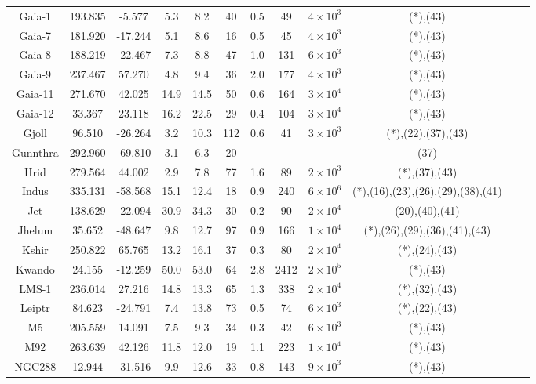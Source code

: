 \begin{table}
\begin{tabular}{cSSSScSccccc}
Gaia-1 & 193.835 & -5.577 & 5.3 & 8.2 & 40 & 0.5 & 49 & $4 \times 10^{3}$ & (*),(43) \\
Gaia-7 & 181.920 & -17.244 & 5.1 & 8.6 & 16 & 0.5 & 45 & $4 \times 10^{3}$ & (*),(43) \\
Gaia-8 & 188.219 & -22.467 & 7.3 & 8.8 & 47 & 1.0 & 131 & $6 \times 10^{3}$ & (*),(43) \\
Gaia-9 & 237.467 & 57.270 & 4.8 & 9.4 & 36 & 2.0 & 177 & $4 \times 10^{3}$ & (*),(43) \\
Gaia-11 & 271.670 & 42.025 & 14.9 & 14.5 & 50 & 0.6 & 164 & $3 \times 10^{4}$ & (*),(43) \\
Gaia-12 & 33.367 & 23.118 & 16.2 & 22.5 & 29 & 0.4 & 104 & $3 \times 10^{4}$ & (*),(43) \\
Gjoll & 96.510 & -26.264 & 3.2 & 10.3 & 112 & 0.6 & 41 & $3 \times 10^{3}$ & (*),(22),(37),(43) \\
Gunnthra & 292.960 & -69.810 & 3.1 & 6.3 & 20 & & & & (37) \\
Hrid & 279.564 & 44.002 & 2.9 & 7.8 & 77 & 1.6 & 89 & $2 \times 10^{3}$ & (*),(37),(43) \\
Indus & 335.131 & -58.568 & 15.1 & 12.4 & 18 & 0.9 & 240 & $6 \times 10^{6}$ & (*),(16),(23),(26),(29),(38),(41) \\
Jet & 138.629 & -22.094 & 30.9 & 34.3 & 30 & 0.2 & 90 & $2 \times 10^{4}$ & (20),(40),(41) \\
Jhelum & 35.652 & -48.647 & 9.8 & 12.7 & 97 & 0.9 & 166 & $1 \times 10^{4}$ & (*),(26),(29),(36),(41),(43) \\
Kshir & 250.822 & 65.765 & 13.2 & 16.1 & 37 & 0.3 & 80 & $2 \times 10^{4}$ & (*),(24),(43) \\
Kwando & 24.155 & -12.259 & 50.0 & 53.0 & 64 & 2.8 & 2412 & $2 \times 10^{5}$ & (*),(43) \\
LMS-1 & 236.014 & 27.216 & 14.8 & 13.3 & 65 & 1.3 & 338 & $2 \times 10^{4}$ & (*),(32),(43) \\
Leiptr & 84.623 & -24.791 & 7.4 & 13.8 & 73 & 0.5 & 74 & $6 \times 10^{3}$ & (*),(22),(43) \\
M5 & 205.559 & 14.091 & 7.5 & 9.3 & 34 & 0.3 & 42 & $6 \times 10^{3}$ & (*),(43) \\
M92 & 263.639 & 42.126 & 11.8 & 12.0 & 19 & 1.1 & 223 & $1 \times 10^{4}$ & (*),(43) \\
NGC288 & 12.944 & -31.516 & 9.9 & 12.6 & 33 & 0.8 & 143 & $9 \times 10^{3}$ & (*),(43) \\
\hline \hline
\end{tabular}
\end{table}
